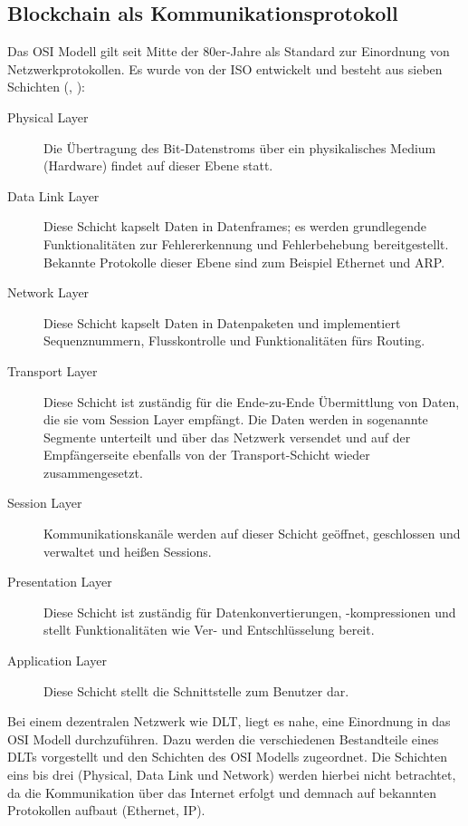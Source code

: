 \subsection{Blockchain als Kommunikationsprotokoll}
\label{subsec:fundamentals:dlt:protocol}
Das \ac{OSI} Modell gilt seit Mitte der 80er-Jahre als Standard zur Einordnung von Netzwerkprotokollen. Es wurde von der \ac{ISO} entwickelt und besteht aus sieben Schichten (\cite{OSI1980}, \cite{osi2014}):
\begin{description}
  \item[Physical Layer] Die Übertragung des Bit-Datenstroms über ein physikalisches Medium (Hardware) findet auf dieser Ebene statt.
  \item[Data Link Layer] Diese Schicht kapselt Daten in Datenframes; es werden grundlegende Funktionalitäten zur Fehlererkennung und Fehlerbehebung bereitgestellt. Bekannte Protokolle dieser Ebene sind zum Beispiel Ethernet und \ac{ARP}.
  \item[Network Layer] Diese Schicht kapselt Daten in Datenpaketen und implementiert Sequenznummern, Flusskontrolle und Funktionalitäten fürs Routing.
  \item[Transport Layer] Diese Schicht ist zuständig für die Ende-zu-Ende Übermittlung von Daten, die sie vom Session Layer empfängt. Die Daten werden in sogenannte Segmente unterteilt und über das Netzwerk versendet und auf der Empfängerseite ebenfalls von der Transport-Schicht wieder zusammengesetzt.
  \item[Session Layer] Kommunikationskanäle werden auf dieser Schicht geöffnet, geschlossen und verwaltet und heißen Sessions.
  \item[Presentation Layer] Diese Schicht ist zuständig für Datenkonvertierungen, -kompressionen und stellt Funktionalitäten wie Ver- und Entschlüsselung bereit.
  \item[Application Layer] Diese Schicht stellt die Schnittstelle zum Benutzer dar.
\end{description}

Bei einem dezentralen Netzwerk wie \ac{DLT}, liegt es nahe, eine Einordnung in das \ac{OSI} Modell durchzuführen. Dazu werden die verschiedenen Bestandteile eines \ac{DLT}s vorgestellt und den Schichten des \ac{OSI} Modells zugeordnet. Die Schichten eins bis drei (Physical, Data Link und Network) werden hierbei nicht betrachtet, da die Kommunikation über das Internet erfolgt und demnach auf bekannten Protokollen aufbaut (Ethernet, IP).

